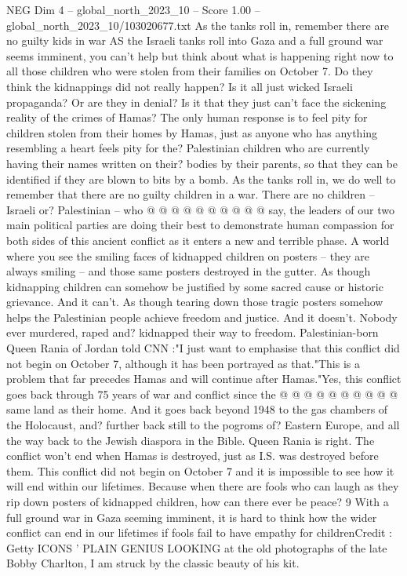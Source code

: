 \begin{textsample}{NEG Dim 4 – global\_north\_2023\_10 – Score 1.00 – global\_north\_2023\_10/103020677.txt}  \label{ex:f4_neg_019}
As the tanks roll in, remember there are no guilty kids in war AS the Israeli tanks roll into Gaza and a full ground war seems imminent, you can't help but think about what is happening right now to all those children who were stolen from their families on October 7.
Do they think the kidnappings did not really happen?
Is it all just wicked Israeli propaganda?
Or are they in denial?
Is it that they just can't face the sickening reality of the crimes of Hamas?
The only human response is to feel pity for children stolen from their homes by Hamas, just as anyone who has anything resembling a heart feels pity for the?
Palestinian children who are currently having their names written on their? bodies by their parents, so that they can be identified if they are blown to bits by a bomb.
As the tanks roll in, we do well to remember that there are no guilty children in a war.
There are no children -- Israeli or?
Palestinian -- who @ @ @ @ @ @ @ @ @ @ say, the leaders of our two main political parties are doing their best to demonstrate human compassion for both sides of this ancient conflict as it enters a new and terrible phase.
A world where you see the smiling faces of kidnapped children on posters -- they are always smiling -- and those same posters destroyed in the gutter.
As though kidnapping children can somehow be justified by some sacred cause or historic grievance.
And it can't.
As though tearing down those tragic posters somehow helps the Palestinian people achieve freedom and justice.
And it doesn't.
Nobody ever murdered, raped and? kidnapped their way to freedom.
Palestinian-born Queen Rania of Jordan told CNN :"I just want to emphasise that this conflict did not begin on October 7, although it has been portrayed as that."This is a problem that far precedes Hamas and will continue after Hamas."Yes, this conflict goes back through 75 years of war and conflict since the @ @ @ @ @ @ @ @ @ @ same land as their home.
And it goes back beyond 1948 to the gas chambers of the Holocaust, and? further back still to the pogroms of?
Eastern Europe, and all the way back to the Jewish diaspora in the Bible.
Queen Rania is right.
The conflict won't end when Hamas is destroyed, just as I.S. was destroyed before them.
This conflict did not begin on October 7 and it is impossible to see how it will end within our lifetimes.
Because when there are fools who can laugh as they rip down posters of kidnapped children, how can there ever be peace? 9 With a full ground war in Gaza seeming imminent, it is hard to think how the wider conflict can end in our lifetimes if fools fail to have empathy for childrenCredit : Getty ICONS ' PLAIN GENIUS LOOKING at the old photographs of the late Bobby Charlton, I am struck by the classic beauty of his kit.

\end{textsample}
